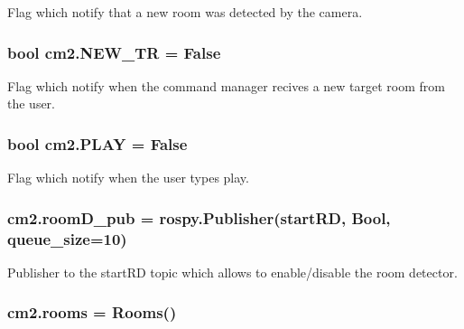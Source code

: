 Flag which notify that a new room was detected by the camera. 

\subsubsection[{\texorpdfstring{N\+E\+W\+\_\+\+TR}{NEW_TR}}]{\setlength{\rightskip}{0pt plus 5cm}bool cm2.\+N\+E\+W\+\_\+\+TR = False}\hypertarget{namespacecm2_ab40a0f001925a7d51952f6d61c0f1bc1}{}\label{namespacecm2_ab40a0f001925a7d51952f6d61c0f1bc1}


Flag which notify when the command manager recives a new target room from the user. 

\subsubsection[{\texorpdfstring{P\+L\+AY}{PLAY}}]{\setlength{\rightskip}{0pt plus 5cm}bool cm2.\+P\+L\+AY = False}\hypertarget{namespacecm2_a9d9c51a8b292c088a990a5b74f0fc572}{}\label{namespacecm2_a9d9c51a8b292c088a990a5b74f0fc572}


Flag which notify when the user types \textquotesingle{}play\textquotesingle{}. 

\subsubsection[{\texorpdfstring{room\+D\+\_\+pub}{roomD_pub}}]{\setlength{\rightskip}{0pt plus 5cm}cm2.\+room\+D\+\_\+pub = rospy.\+Publisher(\textquotesingle{}start\+RD\textquotesingle{}, Bool, queue\+\_\+size=10)}\hypertarget{namespacecm2_a10595b8ceb75d6f270e09b318feec10a}{}\label{namespacecm2_a10595b8ceb75d6f270e09b318feec10a}


Publisher to the start\+RD topic which allows to enable/disable the room detector. 

\subsubsection[{\texorpdfstring{rooms}{rooms}}]{\setlength{\rightskip}{0pt plus 5cm}cm2.\+rooms = {\bf Rooms}()}\hypertarget{namespacecm2_a9f3e1bcc3f1b75e9e4bd3a3784bd056d}{}\label{namespacecm2_a9f3e1bcc3f1b75e9e4bd3a3784bd056d}


